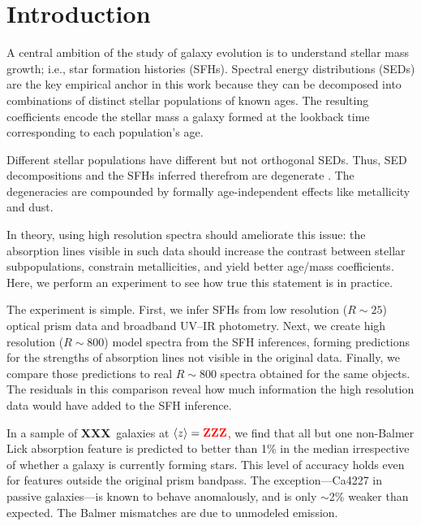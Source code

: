 \documentclass[a4paper,fleqn,usenatbib]{mnras}
\newcommand{\bfr}{\bf\color{red}}
\newcommand{\ntot}{{\bfr XXX}} %
\newcommand{\midz}{{\bfr ZZZ}} %
\begin{document}


\section{Introduction}
\label{sec:intro}

A central ambition of the study of galaxy evolution is to understand stellar mass growth; i.e., 
star formation histories (SFHs). Spectral energy distributions (SEDs) are the key empirical anchor 
in this work because they can be decomposed into combinations of distinct stellar populations of 
known ages. The resulting coefficients encode the stellar mass a galaxy formed at the lookback time 
corresponding to each population's age.
	
Different stellar populations have different but not orthogonal SEDs. Thus, SED decompositions 
and the SFHs inferred therefrom are degenerate \citep{CidFernandes05}. The degeneracies are 
compounded by formally age-independent effects like metallicity and dust. 

In theory, using high resolution spectra should ameliorate this issue: the absorption lines visible 
in such data should increase the contrast between stellar subpopulations, constrain metallicities, 
and yield better age/mass coefficients. Here, we perform an experiment to see how true this 
statement is in practice.

The experiment is simple. First, we infer SFHs from low resolution ($R\sim25$) optical prism 
data and broadband UV--IR photometry. Next, we create high resolution ($R\sim800$) model spectra 
from the SFH inferences, forming predictions for the strengths of absorption lines not visible in the original
data. Finally, we compare those predictions to real $R\sim800$ spectra obtained for the same objects. 
The residuals in this comparison reveal how much information the high resolution data would have added 
to the SFH inference.

In a sample of \ntot\ galaxies at $\langle z\rangle=\midz$, we find that all but one non-Balmer
Lick absorption feature \citep{Worthey94} is predicted to better than 1\% in the median irrespective
of whether a galaxy is currently forming stars. {\color{red} This level of accuracy holds even 
for features outside the original prism bandpass.} The exception---Ca4227 in passive 
galaxies---is known to behave anomalously, and is only $\sim$2\% weaker than expected. 
The Balmer mismatches are due to unmodeled emission.
\end{document}
